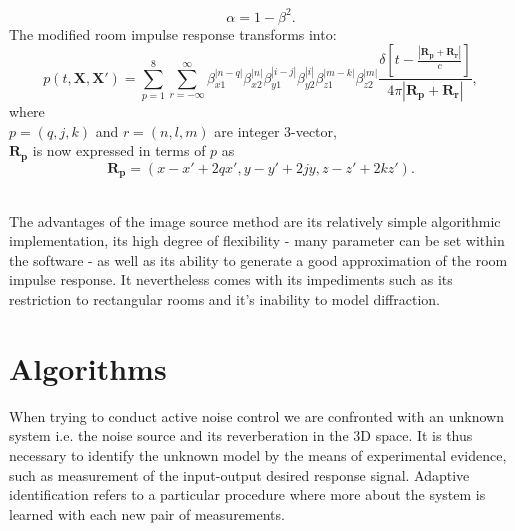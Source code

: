 \begin{equation}
    \alpha=1-\beta^2.
\end{equation}
The modified room impulse response transforms into:
\begin{equation}
    p(t,\mathbf{X},\mathbf{X'})=\sum_{p=1}^8\sum_{r=-\infty}^\infty
    \beta_{x1}^{|n-q|}\beta_{x2}^{|n|}\beta_{y1}^{|i-j|}\beta_{y2}^{|i|}\beta_{z1}^{|m-k|}\beta_{z2}^{|m|}
    \frac{\delta[t-\frac{|\mathbf{R_p}+\mathbf{R_r}|}{c}]}{4\pi|\mathbf{R_p}+\mathbf{R_r}|},
\end{equation}
where\\
$p=(q,j,k)$ and $r=(n,l,m)$ are integer 3-vector,\\
$\mathbf{R_p}$ is now expressed in terms of $p$ as
\begin{equation}
    \mathbf{R_p}=(x-x'+2qx', y-y'+2jy,z-z'+2kz').
\end{equation}

\\The advantages of the image source method are its relatively simple algorithmic implementation, its high degree of flexibility - many parameter can be set within the software - as well as its ability to generate a good approximation of the room impulse response. It nevertheless comes with its impediments such as its restriction to rectangular rooms and it's inability to model diffraction.\cite{Samarasinghe2018}


\section{Algorithms}
When trying to conduct active noise control we are confronted with an unknown system i.e. the noise source and its reverberation in the 3D space. It is thus necessary to identify the unknown model by the means of experimental evidence, such as measurement of the input-output desired response signal. Adaptive identification refers to a particular procedure where more about the system is learned with each new pair of measurements.\cite{Glentis1999}

